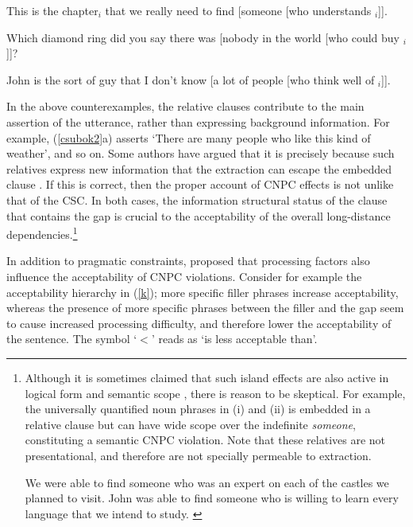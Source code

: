 \documentclass[output=paper
 	        ,biblatex
                ,babelshorthands
                ,newtxmath
                ,draftmode
                ,colorlinks, citecolor=brown
]{langscibook}
\begin{document}
\ex This is the chapter$_i$ that we really need to find [someone [who understands \spc$_i$]].\\
\citep[238]{kluender92}

\ex Which diamond ring did you say there was [nobody in the world [who could
buy \spc$_i$]]?\\
\citep[206]{pollardsag}

\ex John is the sort of guy that I don't know [a lot of people [who think well of
\spc$_i$]].\\
\citep[230]{culicover99}
\zl

In the above counterexamples, the relative clauses contribute to the main assertion of the utterance, rather than expressing background information. For example, (\ref{csubok2}a) asserts `There are many people who like this kind of weather', and so on.
Some authors have argued that it is precisely because such relatives
express new information that the extraction can escape the embedded clause
  \citep{shirlappin,kuno87,Dean,goldberg13}.  If this is correct, then the proper 
  account of CNPC effects is not unlike that of the CSC. In both cases, 
  the information structural status of the clause that contains the gap is crucial
  to the acceptability of the overall long-distance dependencies.\footnote{Although it is sometimes claimed
   that
such  island effects are also active in logical form and semantic scope \citep{may85,ruys,fox,sab,katzira}, 
  there is reason to be skeptical.  For example, the universally quantified noun phrases  in (i) and (ii)  is embedded in a relative clause but can have wide scope over the indefinite \emph{someone}, constituting a semantic CNPC violation. Note that these relatives are not presentational, and therefore are not specially permeable to extraction.

\eal
\ex  We were able to find someone who was an expert on each of the
     castles we planned to visit.  \citep[304]{MRS}
\ex John was able to find someone  who is willing to learn every  language
    that we intend to study. \citep{chavesrnr}
\zllast}

 
 
  
In addition to pragmatic constraints,  \citet{kluender92,kluender}  proposed that 
processing factors also  influence the acceptability of    CNPC violations.
Consider for example the acceptability hierarchy in  (\ref{k});  more specific filler phrases increase acceptability, whereas    the presence of more specific phrases between the filler and the gap seem  to cause increased processing difficulty, and therefore   lower the acceptability of the sentence.  The symbol `$<$' reads as `is less acceptable than'.
\end{document}
